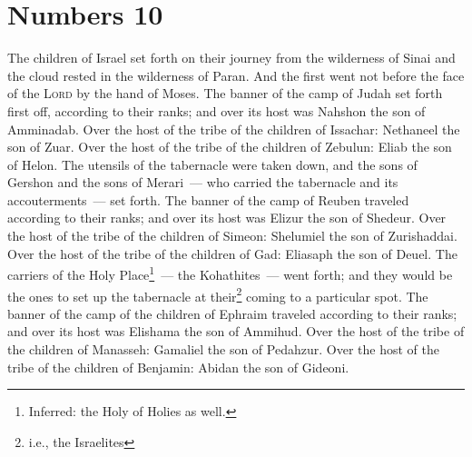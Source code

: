 \section{Numbers 10}\label{Numbers 10}
\begin{enumerate}[align=center]
     The children of Israel set forth on their journey from the wilderness of Sinai and the cloud rested in the wilderness of Paran.%
     And the first went not before the face of the \textsc{Lord} by the hand of Moses.%
     The banner of the camp of Judah set forth first off, according to their ranks; and over its host was Nahshon the son of Amminadab.%
     Over the host of the tribe of the children of Issachar: Nethaneel the son of Zuar.%
     Over the host of the tribe of the children of Zebulun: Eliab the son of Helon.%
     The utensils of the tabernacle were taken down, and the sons of Gershon and the sons of Merari~--- who carried the tabernacle and its accouterments~--- set forth.%
     The banner of the camp of Reuben traveled according to their ranks; and over its host was Elizur the son of Shedeur.%
     Over the host of the tribe of the children of Simeon: Shelumiel the son of Zurishaddai.%
     Over the host of the tribe of the children of Gad: Eliasaph the son of Deuel.%
     The carriers of the Holy Place\footnote{Inferred: the Holy of Holies as well.}~--- the Kohathites~--- went forth; and they would be the ones to set up the tabernacle at their\footnote{i.e., the Israelites} coming to a particular spot.%
     The banner of the camp of the children of Ephraim traveled according to their ranks; and over its host was Elishama the son of Ammihud.%
     Over the host of the tribe of the children of Manasseh: Gamaliel the son of Pedahzur.%
     Over the host of the tribe of the children of Benjamin: Abidan the son of Gideoni.%

\end{enumerate}
